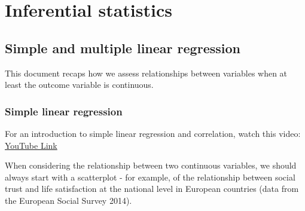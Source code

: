 \documentclass[
]{book}
\newenvironment{Shaded}{\begin{snugshade}}{\end{snugshade}}
\newcommand{\CommentTok}[1]{\textcolor[rgb]{0.56,0.35,0.01}{\textit{#1}}}
\newcommand{\DataTypeTok}[1]{\textcolor[rgb]{0.13,0.29,0.53}{#1}}
\newcommand{\DecValTok}[1]{\textcolor[rgb]{0.00,0.00,0.81}{#1}}
\newcommand{\KeywordTok}[1]{\textcolor[rgb]{0.13,0.29,0.53}{\textbf{#1}}}
\newcommand{\NormalTok}[1]{#1}
\newcommand{\OperatorTok}[1]{\textcolor[rgb]{0.81,0.36,0.00}{\textbf{#1}}}
\newcommand{\StringTok}[1]{\textcolor[rgb]{0.31,0.60,0.02}{#1}}
\begin{document}
\hypertarget{part-inferential-statistics}{%
\part*{Inferential statistics}\label{part-inferential-statistics}}

\hypertarget{simple-and-multiple-linear-regression}{%
\chapter{Simple and multiple linear regression}\label{simple-and-multiple-linear-regression}}

This document recaps how we assess relationships between variables when
at least the outcome variable is continuous.

\hypertarget{simple-linear-regression}{%
\section{Simple linear regression}\label{simple-linear-regression}}

For an introduction to simple linear regression and correlation, watch
this video: \textcolor{blue}{\href{https://www.youtube.com/embed/uoMjSFApBTY?rel=0&modestbranding=1&loop=1&playlist=sk7TT5qM5Hw}{YouTube Link}}

When considering the relationship between two continuous variables, we
should always start with a scatterplot - for example, of the
relationship between social trust and life satisfaction at the national
level in European countries (data from the European Social Survey 2014).

\begin{Shaded}
\end{Shaded}
\end{document}
